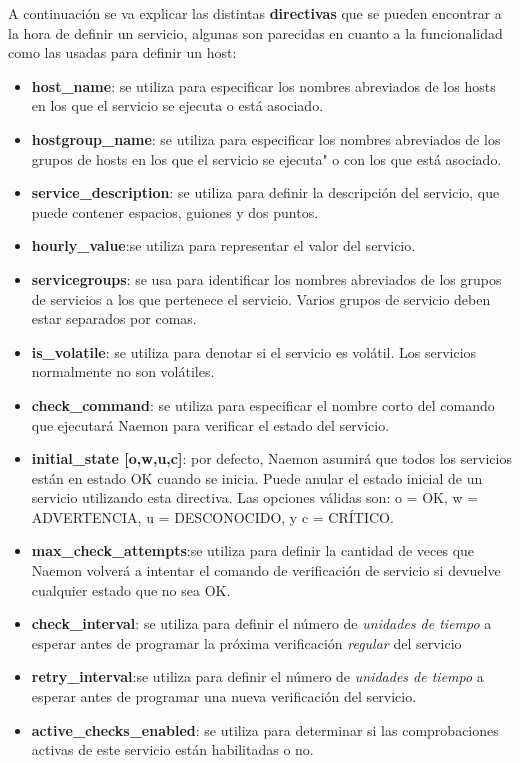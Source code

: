 A continuación se va explicar las distintas \textbf{directivas} que se pueden encontrar a la hora de definir un servicio, algunas son parecidas en cuanto a la funcionalidad como las usadas para definir un host:
\begin{itemize}
	\item 	\textbf{host\_name}: se utiliza para especificar los nombres abreviados de los hosts en los que el servicio se ejecuta o está asociado.	
	\item \textbf{hostgroup\_name}:	se utiliza para especificar los nombres abreviados de los grupos de hosts en los que el servicio se ejecuta" o con los que está asociado. 
	\item \textbf{service\_description}: se utiliza para definir la descripción del servicio, que puede contener espacios, guiones y dos puntos.
	\item \textbf{hourly\_value}:se utiliza para representar el valor del servicio.	
	\item \textbf{servicegroups}: se usa para identificar los nombres abreviados de los grupos de servicios a los que pertenece el servicio. Varios grupos de servicio deben estar separados por comas. 	
	\item \textbf{is\_volatile}: se utiliza para denotar si el servicio es volátil. Los servicios normalmente no son volátiles. 
	\item \textbf{check\_command}: se utiliza para especificar el nombre corto del comando que ejecutará Naemon para verificar el estado del servicio. 	
	\item \textbf{initial\_state [o,w,u,c]}: por defecto, Naemon asumirá que todos los servicios están en estado OK cuando se inicia. Puede anular el estado inicial de un servicio utilizando esta directiva. Las opciones válidas son: o = OK, w = ADVERTENCIA, u = DESCONOCIDO, y c = CRÍTICO.
	\item \textbf{max\_check\_attempts}:se utiliza para definir la cantidad de veces que Naemon volverá a intentar el comando de verificación de servicio si devuelve cualquier estado que no sea OK. 	
	\item \textbf{check\_interval}: se utiliza para definir el número de \textit{unidades de tiempo} a esperar antes de programar la próxima verificación \textit{regular} del servicio	
	\item \textbf{retry\_interval}:se utiliza para definir el número de \textit{unidades de tiempo} a esperar antes de programar una nueva verificación del servicio.	
	\item \textbf{active\_checks\_enabled}: se utiliza para determinar si las comprobaciones activas de este servicio están habilitadas o no. 	

\end{itemize}
